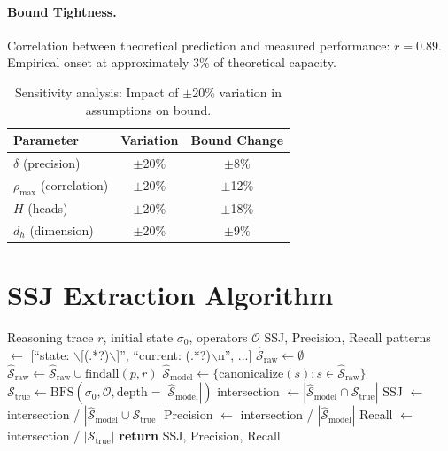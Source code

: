 \documentclass{article}
\theoremstyle{plain}
\theoremstyle{definition}
\theoremstyle{remark}
\begin{document}
\paragraph{Bound Tightness.} Correlation between theoretical prediction and measured performance: $r = 0.89$. Empirical onset at approximately 3\% of theoretical capacity.

\begin{table}[h]
\centering
\caption{Sensitivity analysis: Impact of $\pm$20\% variation in assumptions on bound.}
\label{tab:sensitivity}
\begin{tabular}{@{}lcc@{}}
\toprule
\textbf{Parameter} & \textbf{Variation} & \textbf{Bound Change} \\
\midrule
$\delta$ (precision) & $\pm$20\% & $\pm$8\% \\
$\rho_{\max}$ (correlation) & $\pm$20\% & $\pm$12\% \\
$H$ (heads) & $\pm$20\% & $\pm$18\% \\
$d_h$ (dimension) & $\pm$20\% & $\pm$9\% \\
\bottomrule
\end{tabular}
\end{table}


\section{SSJ Extraction Algorithm}
\label{app:ssj}

\begin{algorithm}[h]
\caption{State-Space Jaccard Extraction}
\begin{algorithmic}[1]
\REQUIRE Reasoning trace $r$, initial state $\sigma_0$, operators $\mathcal{O}$
\ENSURE SSJ, Precision, Recall
\STATE patterns $\leftarrow$ [``state: $\backslash$[(.*?)$\backslash$]'', ``current: (.*?)$\backslash$n'', ...]
\STATE $\hat{\mathcal{S}}_\text{raw} \leftarrow \emptyset$
    \STATE $\hat{\mathcal{S}}_\text{raw} \leftarrow \hat{\mathcal{S}}_\text{raw} \cup \text{findall}(p, r)$
\ENDFOR
\STATE $\hat{\mathcal{S}}_\text{model} \leftarrow \{\text{canonicalize}(s) : s \in \hat{\mathcal{S}}_\text{raw}\}$
\STATE $\mathcal{S}_\text{true} \leftarrow \text{BFS}(\sigma_0, \mathcal{O}, \text{depth}=|\hat{\mathcal{S}}_\text{model}|)$
\STATE intersection $\leftarrow |\hat{\mathcal{S}}_\text{model} \cap \mathcal{S}_\text{true}|$
\STATE SSJ $\leftarrow$ intersection / $|\hat{\mathcal{S}}_\text{model} \cup \mathcal{S}_\text{true}|$
\STATE Precision $\leftarrow$ intersection / $|\hat{\mathcal{S}}_\text{model}|$
\STATE Recall $\leftarrow$ intersection / $|\mathcal{S}_\text{true}|$
\STATE \textbf{return} SSJ, Precision, Recall
\end{algorithmic}
\end{algorithm}
\end{document}
